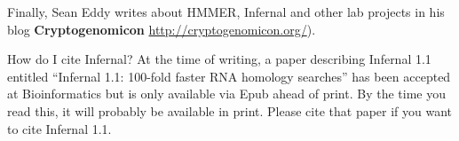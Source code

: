Finally, Sean Eddy writes about HMMER, Infernal and other lab projects in
his blog \textbf{Cryptogenomicon} \url{http://cryptogenomicon.org/}).

\begin{srefaq}{How do I cite Infernal?}
At the time of writing, a paper describing Infernal 1.1 entitled
``Infernal 1.1: 100-fold faster RNA homology searches'' has been
accepted at Bioinformatics\citep{Nawrocki13c} but is only available
via Epub ahead of print. By the time you read this, it will probably 
be available in print. Please cite that paper if you want to cite
Infernal 1.1.
\end{srefaq}












  









